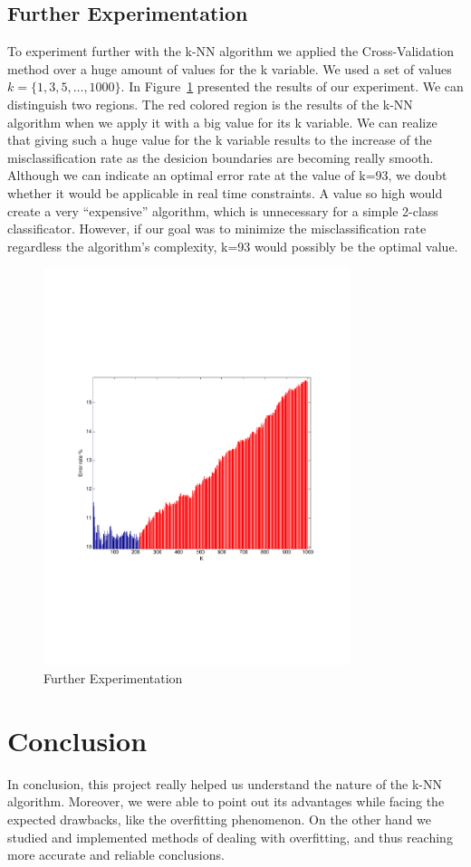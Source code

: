 \documentclass[letterpaper,11pt]{article}
\begin{document}
\subsection*{Further Experimentation}
To experiment further with the k-NN algorithm we applied the Cross-Validation method over a huge amount of values for the k variable. We used a set of values $k= \lbrace 1, 3, 5,\ldots, 1000 \rbrace$. In Figure~\ref{fig:5} presented the results of our experiment. We can distinguish two regions. The red colored region is the results of the k-NN algorithm when we apply it with a big value for its k variable. We can realize that giving such a huge value for the k variable results to the increase of the misclassification rate as the desicion boundaries are becoming really smooth. Although we can indicate an optimal error rate at the value of k=93, we doubt whether it would be applicable in real time constraints. A value so high would create a very ``expensive'' algorithm, which is unnecessary for a simple 2-class classificator. However, if our goal was to minimize the misclassification rate regardless the algorithm's complexity, k=93 would possibly be the optimal value.

\begin{figure}[!t]
\centering
  \includegraphics[trim = 0cm 7cm 0cm 7cm, clip, width=0.8\textwidth]{figures/FurtherTest.pdf}
  \caption{Further Experimentation}
  \label{fig:5}
\end{figure}

 \section*{Conclusion}
In conclusion, this project really helped us understand the nature of the k-NN algorithm. Moreover, we were able to point out its advantages while facing the expected drawbacks, like the overfitting phenomenon. On the other hand we studied and implemented methods of dealing with overfitting, and thus reaching more accurate and reliable conclusions.


    
\end{document}
